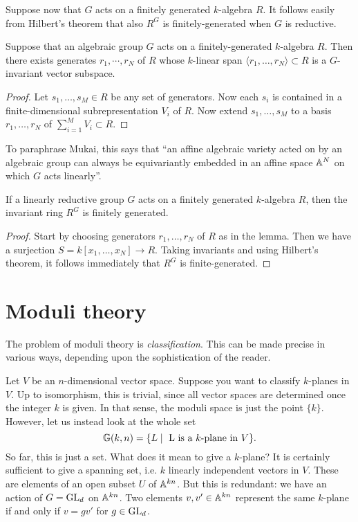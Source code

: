 \documentclass[11pt, english]{article}
\begin{document}
Suppose now that $G$ acts on a finitely generated $k$-algebra $R$. It follows easily from Hilbert's theorem that also $R^G$ is finitely-generated when $G$ is reductive.

\begin{lemma}
 Suppose that an algebraic group $G$ acts on a finitely-generated $k$-algebra $R$. Then there exists generates $r_1,\cdots,r_N$ of $R$ whose $k$-linear span $\langle r_1,\ldots, r_N \rangle \subset R$ is a $G$-invariant vector subspace.
\end{lemma}
\begin{proof}
Let $s_1,\ldots,s_M \in R$ be any set of generators. Now each $s_i$ is contained in a finite-dimensional subrepresentation $V_i$ of $R$. Now extend $s_1,\ldots, s_M$ to a basis $r_1,\ldots, r_N$ of $\sum_{i=1}^M V_i \subset R$.
\end{proof}

To paraphrase Mukai, this says that ``an affine algebraic variety acted on by an algebraic group can always be equivariantly embedded in an affine space $\mathbb{A}^N$ on which $G$ acts linearly''.

\begin{thm}
If a linearly reductive group $G$ acts on a finitely generated $k$-algebra $R$, then the invariant ring $R^G$ is finitely generated.
\end{thm}
\begin{proof}
Start by choosing generators $r_1,\ldots,r_N$ of $R$ as in the lemma. Then we have a surjection $S=k[x_1,\ldots,x_N] \to R$. Taking invariants and using Hilbert's theorem, it follows immediately that $R^G$ is finite-generated.
\end{proof}

\section{Moduli theory}

The problem of moduli theory is \emph{classification}. This can be made precise in various ways, depending upon the sophistication of the reader.

Let $V$ be an $n$-dimensional vector space. Suppose you want to classify $k$-planes in $V$. Up to isomorphism, this is trivial, since all vector spaces are determined once the integer $k$ is given. In that sense, the moduli space is just the point $\{k \}$. However, let us instead look at the whole set
$$ \mathbb{G}(k,n) = \{ L \mid \text{ L is a $k$-plane in $V$} \}.$$
So far, this is just a set. What does it mean to give a $k$-plane? It is certainly sufficient to give a spanning set, i.e. $k$ linearly independent vectors in $V$. These are elements of an open subset $U$ of $\mathbb{A}^{kn}$. But this is redundant: we have an action of $G=\operatorname{GL}_d$ on $\mathbb{A}^{kn}$. Two elements $v,v' \in \mathbb{A}^{kn}$  represent the same $k$-plane if and only if $v =gv'$ for $g \in \operatorname{GL}_d$.
\end{document}
